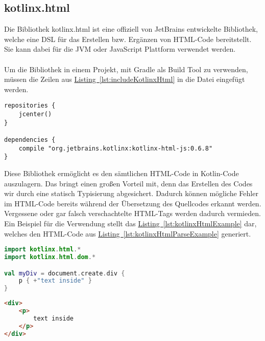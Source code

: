 \subsection{kotlinx.html}\label{sec:kotlinxHtml}
Die Bibliothek kotlinx.html \cite{kotlinxHtml} ist eine offiziell von JetBrains entwickelte Bibliothek, welche eine \gls{DSL} für das Erstellen bzw. Ergänzen von HTML-Code bereitstellt. Sie kann dabei für die \gls{JVM} oder JavaScript Plattform verwendet werden.\\
\\
Um die Bibliothek in einem Projekt, mit Gradle als Build Tool zu verwenden, müssen die Zeilen aus \hyperref[lst:includeKotlinxHtml]{Listing~\ref{lst:includeKotlinxHtml}} in die Datei  eingefügt werden.
\begin{lstlisting}[style=lstStyleFramed, language=Gradle, caption={Einbindung der Bibliothek kotlinx.html mithilfe von Gradle}, label=lst:includeKotlinxHtml, float]
repositories {
	jcenter()
}

dependencies {
	compile "org.jetbrains.kotlinx:kotlinx-html-js:0.6.8"
}
\end{lstlisting}
Diese Bibliothek ermöglicht es den sämtlichen HTML-Code in Kotlin-Code auszulagern. Das bringt einen großen Vorteil mit, denn das Erstellen des Codes wir durch eine statisch Typisierung abgesichert. Dadurch können mögliche Fehler im HTML-Code bereits während der Übersetzung des Quellcodes erkannt werden. Vergessene oder gar falsch verschachtelte HTML-Tags werden dadurch vermieden. Ein Beispiel für die Verwendung stellt das \hyperref[lst:kotlinxHtmlExample]{Listing~\ref{lst:kotlinxHtmlExample}} dar, welches den HTML-Code aus \hyperref[lst:kotlinxHtmlParseExample]{Listing~\ref{lst:kotlinxHtmlParseExample}} generiert.
\begin{lstlisting}[style=lstStyleFramed, language=Kotlin, caption={Beispiel: Verwendung der Bibliothek kotlinx.html \cite{kotlinxHtmlExample}}, label=lst:kotlinxHtmlExample, float]
import kotlinx.html.*
import kotlinx.html.dom.*

val myDiv = document.create.div {
	p { +"text inside" }
}
\end{lstlisting}
\begin{lstlisting}[style=lstStyleFramed, language=html, caption={Beispiel: Verwendung der Bibliothek kotlinx.html (Ergebnis)}, label=lst:kotlinxHtmlParseExample, float]
<div>
	<p>
		text inside
	</p>
</div>
\end{lstlisting}

